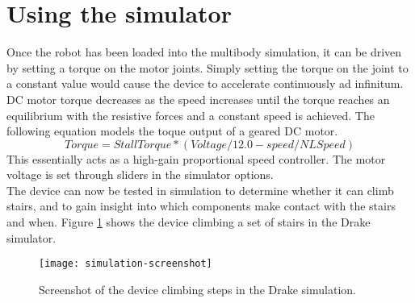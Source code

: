 \section{Using the simulator}
Once the robot has been loaded into the multibody simulation, it can be driven by setting a torque on the motor joints. Simply setting the torque on the joint to a constant value would cause the device to accelerate continuously ad infinitum. DC motor torque decreases as the speed increases until the torque reaches an equilibrium with the resistive forces and a constant speed is achieved. The following equation models the toque output of a geared DC motor.\\
\begin{equation}
Torque = StallTorque*(Voltage/12.0-speed/NLSpeed) \label{eq:torqueVoltageSpeed}
\end{equation}
This essentially acts as a high-gain proportional speed controller. The motor voltage is set through sliders in the simulator options. \\
The device can now be tested in simulation to determine whether it can climb stairs, and to gain insight into which components make contact with the stairs and when. Figure \ref{fig:simulation-screenshot} shows the device climbing a set of stairs in the Drake simulator.\\

\begin{figure}[h]
	\centering
	\texttt{[image: simulation-screenshot]}
	\caption{Screenshot of the device climbing steps in the Drake simulation.}
	\label{fig:simulation-screenshot}
\end{figure}